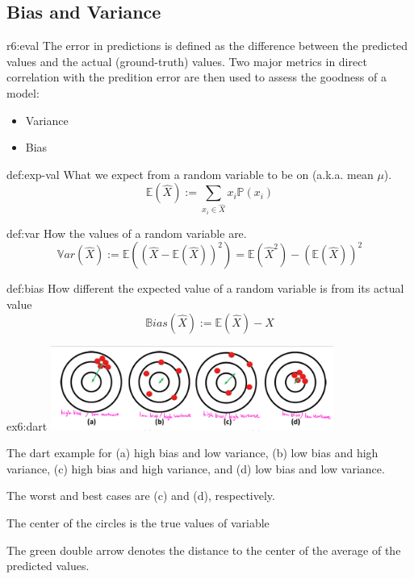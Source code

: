 \documentclass{tron}
\begin{document}
\subsection{Bias and Variance}
\begin{remark}{r6:eval}
	The error in predictions is defined as the difference between the predicted values and the actual (ground-truth) values. Two major metrics in direct correlation with the predition error are then used to assess the goodness of a model:
	\begin{itemize}
		\item Variance
		\item Bias
	\end{itemize}
	
	\begin{definition}{def:exp-val}
		What we expect from a random variable to be on  (a.k.a. mean $\mu$).
			\begin{equation}
				\mathbb{E}(\hat{X}) := \sum_{x_i \in \hat{X}} x_i {\mathbb{P}(x_i)}
			\end{equation}
	\end{definition}
	
	\begin{definition}[Variance]{def:var}
		How  the values of a random variable are.
			\begin{equation}
				\mathbb{V}ar (\hat{X}) := \mathbb{E}\left((\hat{X} - \mathbb{E}(\hat{X}))^2 \right) = \mathbb{E}(\hat{X}^2) - (\mathbb{E}(\hat{X}))^2
			\end{equation}
	\end{definition}
	
	\begin{definition}[Bias]{def:bias}
		How different the expected value of a random variable is from its actual value
			\begin{equation}
				\mathbb{B}ias(\hat{X}):= \mathbb{E}(\hat{X}) - X
			\end{equation}
	\end{definition}
\end{remark}

\begin{example}{ex6:dart}
	\includegraphics[width=350px]{Figs/Lec6/var}
	
	The dart example for (a) high bias and low variance, (b) low bias and high variance, (c) high bias and high variance, and (d) low bias and low variance. 

	The worst and best cases are (c) and (d), respectively. 
	
	The center of the circles is the true values of variable
	
	The green double arrow denotes the distance to the center of the average of the predicted values.
\end{example}
\end{document}

